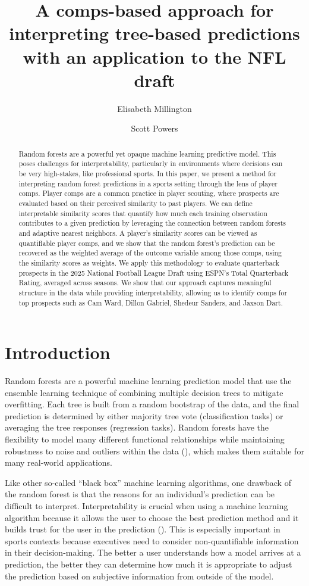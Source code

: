 \documentclass{article}
\title{A comps-based approach for interpreting tree-based predictions with an application to the NFL draft}
\author[1]{Elisabeth Millington}
\author[2]{Scott Powers}
\affil[1]{Department of Kinesiology, Rice University}
\affil[2]{Department of Sport Management, Rice University}
\begin{document}
\maketitle

\begin{abstract}
  Random forests are a powerful yet opaque machine learning predictive model. This poses challenges for interpretability, particularly in environments where decisions can be very high-stakes, like professional sports. In this paper, we present a method for interpreting random forest predictions in a sports setting through the lens of player comps. Player comps are a common practice in player scouting, where prospects are evaluated based on their perceived similarity to past players. We can define interpretable similarity scores that quantify how much each training observation contributes to a given prediction by leveraging the connection between random forests and adaptive nearest neighbors. A player's similarity scores can be viewed as quantifiable player comps, and we show that the random forest's prediction can be recovered as the weighted average of the outcome variable among those comps, using the similarity scores as weights. We apply this methodology to evaluate quarterback prospects in the 2025 National Football League Draft using ESPN's Total Quarterback Rating, averaged across seasons. We show that our approach captures meaningful structure in the data while providing interpretability, allowing us to identify comps for top prospects such as Cam Ward, Dillon Gabriel, Shedeur Sanders, and Jaxson Dart.
\end{abstract}

\section{Introduction}

Random forests are a powerful machine learning prediction model that use the ensemble learning technique of combining multiple decision trees to mitigate overfitting. Each tree is built from a random bootstrap of the data, and the final prediction is determined by either majority tree vote (classification tasks) or averaging the tree responses (regression tasks). Random forests have the flexibility to model many different functional relationships while maintaining robustness to noise and outliers within the data (\cite{breiman_random_2001}), which makes them suitable for many real-world applications.

Like other so-called ``black box'' machine learning algorithms, one drawback of the random forest is that the reasons for an individual's prediction can be difficult to interpret. Interpretability is crucial when using a machine learning algorithm because it allows the user to choose the best prediction method and it builds trust for the user in the prediction (\cite{ribeiro_why_2016}). This is especially important in sports contexts because executives need to consider non-quantifiable information in their decision-making. The better a user understands how a model arrives at a prediction, the better they can determine how much it is appropriate to adjust the prediction based on subjective information from outside of the model.
\end{document}
